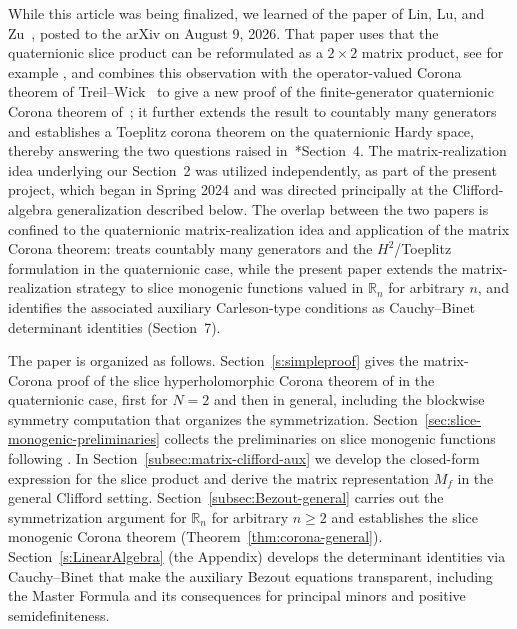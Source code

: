 \documentclass[11pt]{amsart}
\begin{document}
\medskip


While this article was being finalized, we learned of the paper of Lin, Lu, and Zu~\cite{LinLuZu2026}, posted to the arXiv on August 9, 2026. That paper uses that the quaternionic slice product can be reformulated as a $2 \times 2$ matrix product, see for example \cite{MR3554256}, and combines this observation with the operator-valued Corona theorem of Treil--Wick~\cite{MR2158178} to give a new proof of the finite-generator quaternionic Corona theorem of~\cite{CPSW}; it further extends the result to countably many generators and establishes a Toeplitz corona theorem on the quaternionic Hardy space, thereby answering the two questions raised in~\cite{CPSW}*{Section~4}. The matrix-realization idea underlying our Section~2 was utilized independently, as part of the present project, which began in Spring 2024 and was directed principally at the Clifford-algebra generalization described below. The overlap between the two papers is confined to the quaternionic matrix-realization idea and application of the matrix Corona theorem:
 \cite{LinLuZu2026} treats countably many generators and the $H^2$/Toeplitz formulation in the quaternionic case, while the present paper extends the matrix-realization strategy to slice monogenic functions valued in $\mathbb{R}_n$ for arbitrary $n$, and identifies the associated auxiliary Carleson-type conditions as Cauchy--Binet determinant identities (Section~7).

\medskip


The paper is organized as follows.  Section~\ref{s:simpleproof} gives the matrix-Corona proof of the slice hyperholomorphic Corona theorem of \cite{CPSW} in the quaternionic case, first for $N=2$ and then in general, including the blockwise symmetry computation that organizes the symmetrization.  Section~\ref{sec:slice-monogenic-preliminaries} collects the preliminaries on slice monogenic functions following \cites{MR2684426,MR2520116}.  In Section~\ref{subsec:matrix-clifford-aux} we develop the closed-form expression for the slice product and derive the matrix representation $M_f$ in the general Clifford setting.  Section~\ref{subsec:Bezout-general} carries out the symmetrization argument for $\mathbb{R}_n$ for arbitrary $n\ge 2$ and establishes the slice monogenic Corona theorem (Theorem~\ref{thm:corona-general}).  Section~\ref{s:LinearAlgebra} (the Appendix) develops the determinant identities via Cauchy--Binet that make the auxiliary Bezout equations transparent, including the Master Formula and its consequences for principal minors and positive semidefiniteness.
\end{document}
